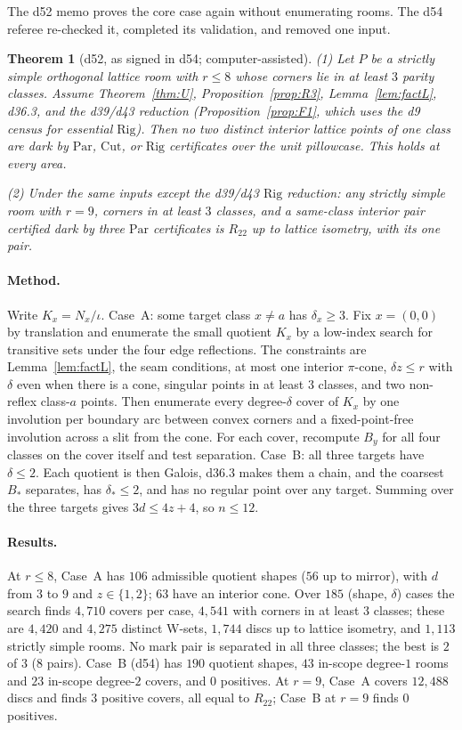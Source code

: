 \documentclass[11pt]{article}
\newtheorem{theorem}{Theorem}
\theoremstyle{definition}
\theoremstyle{remark}
\newcommand{\Par}{\mathrm{Par}}
\newcommand{\Rig}{\mathrm{Rig}}
\newcommand{\Cut}{\mathrm{Cut}}
\newcommand{\Rr}{R_{22}}
\begin{document}
The d52 memo proves the core case again without enumerating rooms. The d54
referee re-checked it, completed its validation, and removed one input.

\begin{theorem}[d52, as signed in d54; computer-assisted]\label{thm:second}
(1) Let $P$ be a strictly simple orthogonal lattice room with $r\le 8$ whose
corners lie in at least $3$ parity classes. Assume Theorem~\ref{thm:U},
Proposition~\ref{prop:R3}, Lemma~\ref{lem:factL}, d36.3, and the d39/d43
reduction (Proposition~\ref{prop:F1}, which uses the d9 census for essential
$\Rig$). Then no two distinct interior lattice points of one class are dark by
$\Par$, $\Cut$, or $\Rig$ certificates over the unit pillowcase. This holds at
every area.

(2) Under the same inputs except the d39/d43 $\Rig$ reduction: any strictly
simple room with $r=9$, corners in at least $3$ classes, and a same-class
interior pair certified dark by three $\Par$ certificates is $\Rr$ up to
lattice isometry, with its one pair.
\end{theorem}

\paragraph{Method.}
Write $K_x=N_x/\iota$. Case~A: some target class $x\ne a$ has
$\delta_x\ge 3$. Fix $x=(0,0)$ by translation and enumerate the small
quotient $K_x$ by a low-index search for transitive sets under the four edge
reflections. The constraints are Lemma~\ref{lem:factL}, the seam conditions,
at most one interior $\pi$-cone, $\delta z\le r$ with $\delta$ even when there
is a cone, singular points in at least $3$ classes, and two non-reflex
class-$a$ points. Then enumerate every degree-$\delta$ cover of $K_x$ by one
involution per boundary arc between convex corners and a fixed-point-free
involution across a slit from the cone. For each cover, recompute $B_y$ for all
four classes on the cover itself and test separation.
Case~B: all three targets have $\delta\le 2$. Each quotient is then Galois,
d36.3 makes them a chain, and the coarsest $B_*$ separates, has $\delta_*\le 2$,
and has no regular point over any target. Summing over the three targets gives
$3d\le 4z+4$, so $n\le 12$.

\paragraph{Results.}
At $r\le 8$, Case~A has $106$ admissible quotient shapes ($56$ up to mirror),
with $d$ from $3$ to $9$ and $z\in\{1,2\}$; $63$ have an interior cone. Over
$185$ (shape, $\delta$) cases the search finds $4{,}710$ covers per case,
$4{,}541$ with corners in at least $3$ classes; these are $4{,}420$ and
$4{,}275$ distinct W-sets, $1{,}744$ discs up to lattice isometry, and $1{,}113$
strictly simple rooms. No mark pair is separated in all three classes; the best
is $2$ of $3$ ($8$ pairs). Case~B (d54) has $190$ quotient shapes, $43$
in-scope degree-$1$ rooms and $23$ in-scope degree-$2$ covers, and $0$
positives. At $r=9$, Case~A covers $12{,}488$ discs and finds $3$ positive
covers, all equal to $\Rr$; Case~B at $r=9$ finds $0$ positives.
\end{document}
